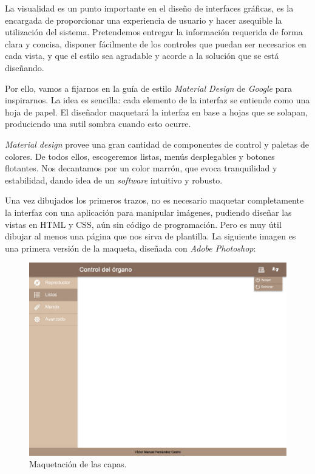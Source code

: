 La visualidad es un punto importante en el diseño de interfaces gráficas, es la encargada de proporcionar una experiencia de usuario y hacer asequible la utilización del sistema. Pretendemos entregar la información requerida de forma clara y concisa, disponer fácilmente de los controles que puedan ser necesarios en cada vista, y que el estilo sea agradable y acorde a la solución que se está diseñando.

Por ello, vamos a fijarnos en la guía de estilo \textit{Material Design} de \textit{Google} \cite{material} para inspirarnos. La idea es sencilla: cada elemento de la interfaz se entiende como una hoja de papel. El diseñador maquetará la interfaz en base a hojas que se solapan, produciendo una sutil sombra cuando esto ocurre.

\textit{Material design} provee una gran cantidad de componentes de control y paletas de colores. De todos ellos, escogeremos listas, menús desplegables y botones flotantes. Nos decantamos por un color marrón, que evoca tranquilidad y estabilidad, dando idea de un \textit{software} intuitivo y robusto.

Una vez dibujados los primeros trazos, no es necesario maquetar completamente la interfaz con una aplicación para manipular imágenes, pudiendo diseñar las vistas en \acrshort{HTML} y \acrshort{CSS}, aún sin código de programación. Pero es muy útil dibujar al menos una página que nos sirva de plantilla. La siguiente imagen es una primera versión de la maqueta, diseñada con \textit{Adobe Photoshop}:

\smallskip

\begin{figure}[H]
	\noindent \begin{centering}
		\includegraphics[width=\linewidth*3/4]{capitulo4/maqueta}
		\par\end{centering}
	\smallskip
	\caption{\label{fig:maqueta} Maquetación de las capas.}
\end{figure}

